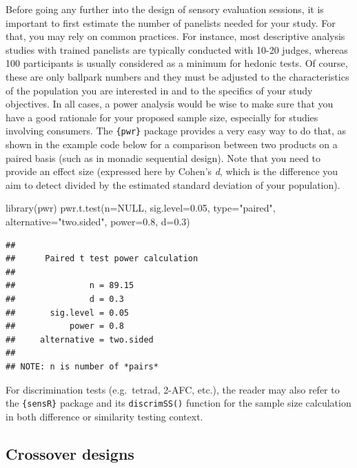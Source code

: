 \documentclass[
]{krantz}
\makeatletter
\newenvironment{Shaded}{\begin{snugshade}}{\end{snugshade}}
\newcommand{\AttributeTok}[1]{\textcolor[rgb]{0.61,0.61,0.61}{#1}}
\newcommand{\ConstantTok}[1]{\textcolor[rgb]{0,0,0}{#1}}
\newcommand{\FloatTok}[1]{\textcolor[rgb]{0.06,0.06,0.06}{#1}}
\newcommand{\FunctionTok}[1]{\textcolor[rgb]{0,0,0}{#1}}
\newcommand{\NormalTok}[1]{#1}
\newcommand{\StringTok}[1]{\textcolor[rgb]{0.5,0.5,0.5}{#1}}
\newenvironment{kframe}{%
\medskip{}
\setlength{\fboxsep}{.8em}
 \def\at@end@of@kframe{}%
 \ifinner\ifhmode%
  \def\at@end@of@kframe{\end{minipage}}%
  \begin{minipage}{\columnwidth}%
 \fi\fi%
 \def\FrameCommand##1{\hskip\@totalleftmargin \hskip-\fboxsep
 \colorbox{shadecolor}{##1}\hskip-\fboxsep
     \hskip-\linewidth \hskip-\@totalleftmargin \hskip\columnwidth}%
 \MakeFramed {\advance\hsize-\width
   \@totalleftmargin\z@ \linewidth\hsize
   \@setminipage}}%
 {\par\unskip\endMakeFramed%
 \at@end@of@kframe}
\renewenvironment{Shaded}{\begin{kframe}}{\end{kframe}}
\makeatother
\begin{document}
Before going any further into the design of sensory evaluation sessions, it is important to first estimate the number of panelists needed for your study. For that, you may rely on common practices. For instance, most descriptive analysis studies with trained panelists are typically conducted with 10-20 judges, whereas 100 participants is usually considered as a minimum for hedonic tests. Of course, these are only ballpark numbers and they must be adjusted to the characteristics of the population you are interested in and to the specifics of your study objectives. In all cases, a power analysis would be wise to make sure that you have a good rationale for your proposed sample size, especially for studies involving consumers. The \texttt{\{pwr\}} package provides a very easy way to do that, as shown in the example code below for a comparison between two products on a paired basis (such as in monadic sequential design). Note that you need to provide an effect size (expressed here by Cohen's \emph{d}, which is the difference you aim to detect divided by the estimated standard deviation of your population).

\begin{Shaded}
\begin{Highlighting}[]
\FunctionTok{library}\NormalTok{(pwr)}
\FunctionTok{pwr.t.test}\NormalTok{(}\AttributeTok{n=}\ConstantTok{NULL}\NormalTok{, }\AttributeTok{sig.level=}\FloatTok{0.05}\NormalTok{, }\AttributeTok{type=}\StringTok{"paired"}\NormalTok{, }
           \AttributeTok{alternative=}\StringTok{"two.sided"}\NormalTok{, }\AttributeTok{power=}\FloatTok{0.8}\NormalTok{, }\AttributeTok{d=}\FloatTok{0.3}\NormalTok{)}
\end{Highlighting}
\end{Shaded}

\begin{verbatim}
## 
##      Paired t test power calculation 
## 
##               n = 89.15
##               d = 0.3
##       sig.level = 0.05
##           power = 0.8
##     alternative = two.sided
## 
## NOTE: n is number of *pairs*
\end{verbatim}

For discrimination tests (e.g.~tetrad, 2-AFC, etc.), the reader may also refer to the \texttt{\{sensR\}} package and its \texttt{discrimSS()} function for the sample size calculation in both difference or similarity testing context.

\hypertarget{Crossover}{%
\subsection{Crossover designs}\label{Crossover}}
\end{document}
